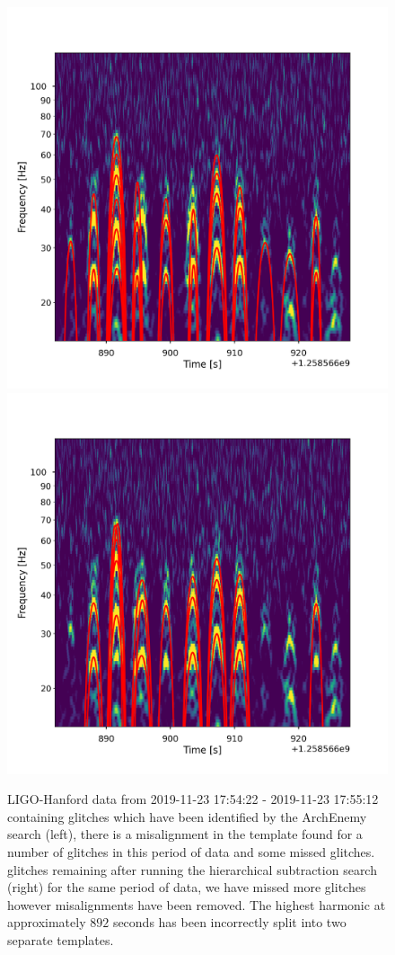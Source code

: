 \begin{figure}
     \centering
     \begin{minipage}[t]{1.0\linewidth}
        \includegraphics[width=0.49\linewidth]{images/archenemy/Section3/3.6/overlay_good_overlays_first.pdf}
        \hspace{0.02\linewidth}
        \includegraphics[width=0.49\linewidth]{images/archenemy/Section3/3.6/overlay_good_overlays_second.pdf}
     \end{minipage}
         \caption{LIGO-Hanford data from 2019-11-23 17:54:22 - 2019-11-23 17:55:12 containing \scl{} glitches which have been identified by the ArchEnemy search (left), there is a misalignment in the template found for a number of glitches in this period of data and some missed glitches. \Scl{} glitches remaining after running the hierarchical subtraction search (right) for the same period of data, we have missed more \scl{} glitches however misalignments have been removed. The highest harmonic at approximately $892$ seconds has been incorrectly split into two separate templates.}
    \label{fig:overlay_goods}
\end{figure}

